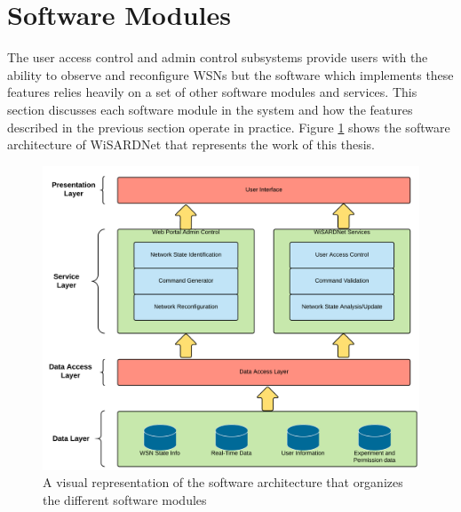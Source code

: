 \section{Software Modules}
The user access control and admin control subsystems provide users with the ability to observe and reconfigure WSNs but the software which implements these features relies heavily on a set of other software modules and services. This section discusses each software module in the system and how the features described in the previous section operate in practice. Figure \ref{fig:software_architecture} shows the software architecture of WiSARDNet that represents the work of this thesis.

\begin{figure}[H]
	\centering
	\includegraphics[width=\textwidth]{figures/software_architecture_diagram.png}
	\caption{A visual representation of the software architecture that organizes the different software modules}
	\label{fig:software_architecture}
\end{figure}



